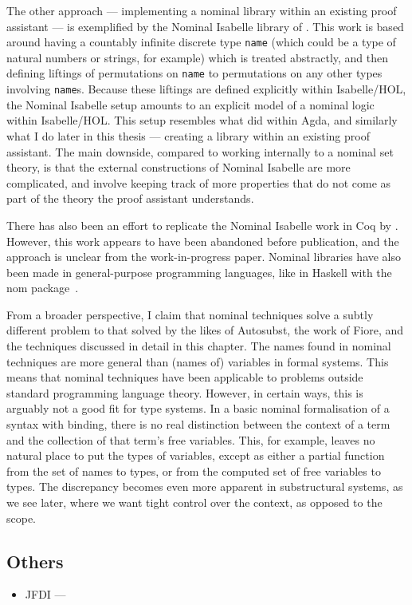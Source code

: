 The other approach --- implementing a nominal library within an existing proof
assistant --- is exemplified by the Nominal Isabelle library of \citet{Urban08}.
This work is based around having a countably infinite discrete type
\texttt{name} (which could be a type of natural numbers or strings, for example)
which is treated abstractly, and then defining liftings of permutations on
\texttt{name} to permutations on any other types involving \texttt{name}s.
Because these liftings are defined explicitly within Isabelle/HOL, the Nominal
Isabelle setup amounts to an explicit model of a nominal logic within
Isabelle/HOL.
This setup resembles what \citet{AACMM21} did within Agda, and similarly what I
do later in this thesis --- creating a library within an existing proof
assistant.
The main downside, compared to working internally to a nominal set theory, is
that the external constructions of Nominal Isabelle are more complicated, and
involve keeping track of more properties that do not come as part of the theory
the proof assistant understands.

There has also been an effort to replicate the Nominal Isabelle work in Coq by
\citet{ABW06}.
However, this work appears to have been abandoned before publication, and the
approach is unclear from the work-in-progress paper.
Nominal libraries have also been made in general-purpose programming languages,
like in Haskell with the nom package~\citep{Gabbay20}.

From a broader perspective, I claim that nominal techniques solve a subtly
different problem to that solved by the likes of Autosubst, the work of Fiore,
and the techniques discussed in detail in this chapter.
The names found in nominal techniques are more general than (names of)
variables in formal systems.
This means that nominal techniques have been applicable to problems outside
standard programming language theory.
However, in certain ways, this is arguably not a good fit for type systems.
In a basic nominal formalisation of a syntax with binding, there is no real
distinction between the context of a term and the collection of that term's free
variables.
This, for example, leaves no natural place to put the types of variables, except
as either a partial function from the set of names to types, or from the
computed set of free variables to types.
The discrepancy becomes even more apparent in substructural systems, as we see
later, where we want tight control over the context, as opposed to the scope.

\subsection{Others}

\begin{itemize}
  \item JFDI --- \citet{BHKM12}
\end{itemize}
